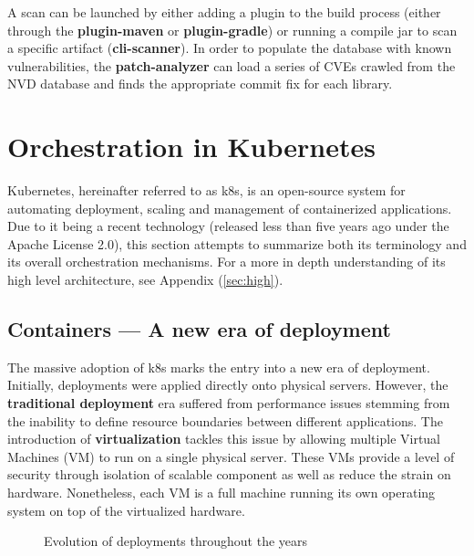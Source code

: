 \documentclass[11pt]{article}
\begin{document}
\vspace{3mm}
A scan can be launched by either adding a plugin to the build process (either through the \textbf{plugin-maven} or \textbf{plugin-gradle}) or running a compile jar to scan a specific artifact (\textbf{cli-scanner}). In order to populate the database with known vulnerabilities, the \textbf{patch-analyzer} can load a series of CVEs crawled from the NVD database and finds the appropriate commit fix for each library. 

\newpage
\section{Orchestration in Kubernetes}

\hspace{5mm} Kubernetes, hereinafter referred to as k8s, is an open-source system for automating deployment, scaling and management of containerized applications. Due to it being a recent technology (released less than five years ago under the Apache License 2.0), this section attempts to summarize both its terminology and its overall orchestration mechanisms. For a more in depth understanding of its high level architecture, see Appendix (\ref{sec:high}). 

\subsection{Containers — A new era of deployment}

\hspace{5mm} The massive adoption of k8s marks the entry into a new era of deployment. Initially, deployments were applied directly onto physical servers. However, the \textbf{traditional deployment} era suffered from performance issues stemming from the inability to define resource boundaries between different applications. The introduction of \textbf{virtualization} tackles this issue by allowing multiple Virtual Machines (VM) to run on a single physical server. These VMs provide a level of security through isolation of scalable component as well as reduce the strain on hardware. Nonetheless, each VM is a full machine running its own operating system on top of the virtualized hardware. 

\vspace{2mm}
\begin{figure}[h]
    \centering
    \quad
    \quad
    \caption{Evolution of deployments throughout the years}
    \label{fig:docker_evolution}
\end{figure}
\end{document}
